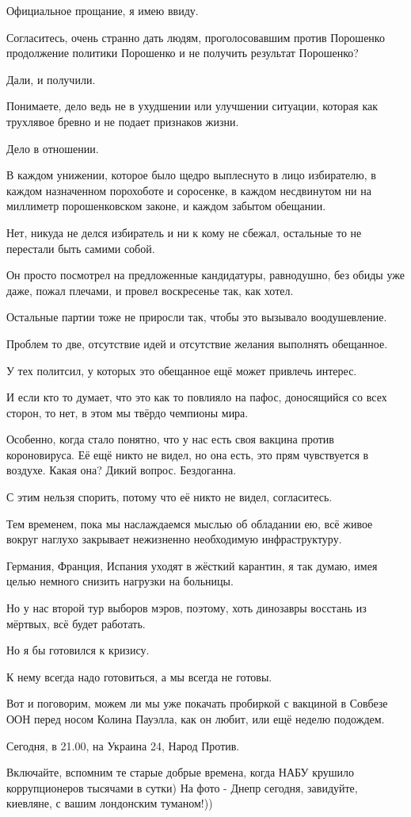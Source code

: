 Официальное прощание, я имею ввиду.

Согласитесь, очень странно дать людям, проголосовавшим против Порошенко
продолжение политики Порошенко и не получить результат Порошенко?

Дали, и получили.

Понимаете, дело ведь не в ухудшении или улучшении ситуации, которая как трухлявое бревно и не подает признаков жизни.

Дело в отношении.

В каждом унижении, которое было щедро выплеснуто в лицо избирателю, в каждом
назначенном порохоботе и соросенке, в каждом несдвинутом ни на миллиметр
порошенковском законе,  и каждом забытом обещании.

Нет, никуда не делся избиратель и ни к кому не сбежал, остальные то не перестали быть самими собой.

Он просто посмотрел на предложенные кандидатуры, равнодушно, без обиды уже
даже, пожал плечами, и провел воскресенье так, как хотел.

Остальные партии тоже не приросли так, чтобы это вызывало воодушевление.

Проблем то две, отсутствие идей и отсутствие желания выполнять обещанное.

У тех политсил, у которых это обещанное ещё может привлечь интерес.

И если кто то думает, что это как то повлияло на пафос, доносящийся со всех
сторон, то нет, в этом мы твёрдо чемпионы мира.

Особенно, когда стало понятно, что у нас есть своя вакцина против короновируса.
Её ещё никто не видел, но она есть, это прям чувствуется в воздухе.
Какая она?
Дикий вопрос.
Бездоганна.

С этим нельзя спорить, потому что её никто не видел, согласитесь.

Тем временем, пока мы наслаждаемся мыслью об обладании ею, всё живое вокруг
наглухо закрывает нежизненно необходимую инфраструктуру.

Германия, Франция, Испания уходят в жёсткий карантин, я так думаю, имея целью
немного снизить нагрузки на больницы.

Но у нас второй тур выборов мэров, поэтому, хоть динозавры восстань из мёртвых, всё будет работать.

Но я бы готовился к кризису.

К нему всегда надо готовиться, а мы всегда не готовы.

Вот и поговорим, можем ли мы уже покачать пробиркой с вакциной в Совбезе ООН
перед носом Колина Пауэлла, как он любит, или ещё неделю подождем.

Сегодня, в 21.00, на Украина 24, Народ Против.

Включайте, вспомним те старые добрые времена, когда НАБУ крушило коррупционеров
тысячами в сутки) На фото - Днепр сегодня, завидуйте, киевляне, с вашим
лондонским туманом!))
